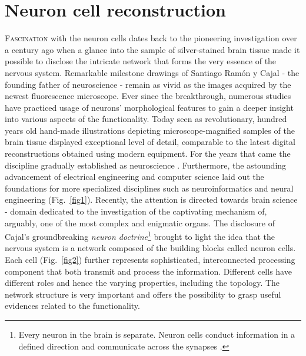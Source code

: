 \section{Neuron cell reconstruction}
\label{sec:neuron-cell}
\lettrine{F}{ascination} with the neuron cells dates back to the pioneering investigation over a century ago when a glance into the sample of silver-stained brain tissue made it possible to disclose the intricate network that forms the very essence of the nervous system. Remarkable milestone drawings of Santiago Ram\'{o}n y Cajal \cite{ramon2008histologia} - the founding father of neuroscience - remain as vivid as the images acquired by the newest fluorescence microscope. Ever since the breakthrough, numerous studies \cite{ascoli2001computer, defelipe2002microstructure, defelipe1992pyramidal, van2001need, scorcioni2004quantitative, mason2007initiation, gensel2010semi, markram2015reconstruction} have practiced usage of neurons' morphological features to gain a deeper insight into various aspects of the functionality. Today seen as revolutionary, hundred years old hand-made illustrations depicting microscope-magnified samples of the brain tissue \cite{swanson2017} displayed exceptional level of detail, comparable to the latest digital reconstructions obtained using modern equipment. For the years that came the discipline gradually established as neuroscience \cite{kandel2000principles}. Furthermore, the astounding advancement of electrical engineering and computer science laid out the foundations for more specialized disciplines such as neuroinformatics and neural engineering (Fig.~\ref{fig1}). Recently, the attention is directed towards brain science - domain dedicated to the investigation of the captivating mechanism of, arguably, one of the most complex and enigmatic organs. The disclosure of Cajal's groundbreaking \textit{neuron doctrine}\footnote{Every neuron in the brain is separate. Neuron cells conduct information in a defined direction and communicate across the synapses \cite{glickstein2006golgi}.} brought to light the idea that the nervous system is a network composed of the building blocks called neuron cells. Each cell (Fig.~\ref{fig2}) further represents sophisticated, interconnected processing component that both transmit and process the information. Different cells have different roles and hence the varying properties, including the topology. The network structure is very important and offers the possibility to grasp useful evidences related to the functionality.

